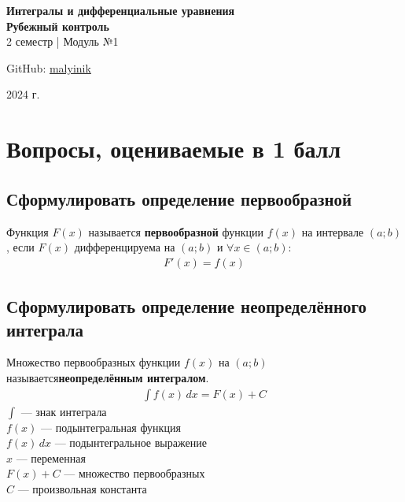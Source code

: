 



\begin{titlepage}
    \vspace*{0pt}
    \vfill
    \centering
    \Huge\textbf{Интегралы и дифференциальные уравнения} \\[7pt]
    \Large\textbf{Рубежный контроль} \\
    \large 2 семестр | Модуль №1 \\ 
    \vfill
    \begin{flushright}
        \normalsize GitHub: \href{https://github.com/malyinik}{malyinik} \\
    \end{flushright}
    \normalsize 2024 г.
\end{titlepage}
\newpage

\tableofcontents
\newpage

\section{Вопросы, оцениваемые в 1 балл}

\subsection{Сформулировать определение первообразной}

\begin{definition}
    Функция $F(x)$ называется \textbf{первообразной} функции $f(x)$ на интервале $(a;b)$, если $F(x)$ дифференцируема на $(a;b)$ и $\forall x \in (a;b)\colon$
    \begin{gather}
        \boxed{F'(x) = f(x)}
    \end{gather}
\end{definition}

\subsection{Сформулировать определение неопределённого интеграла}

\begin{definition}
    Множество первообразных функции $f(x)$ на $(a;b)$ называется\break\textbf{неопределённым интегралом}.
    \begin{gather}
        \boxed{\int f(x)\, dx = F(x) + C}
    \end{gather}
    $\int$ --- знак интеграла\\
    $f(x)$ --- подынтегральная функция\\
    $f(x)\, dx$ --- подынтегральное выражение\\
    $x$ --- переменная\\
    $F(x) + C$ --- множество первообразных\\
    $C$ --- произвольная константа
\end{definition}

